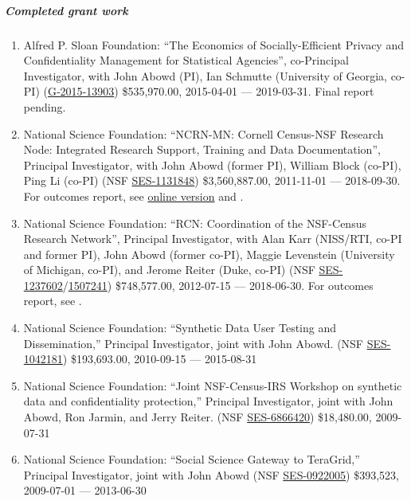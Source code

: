 \documentclass[10pt,letterpaper]{report}
\begin{document}
\subparagraph{Completed grant work}
\begin{enumerate}
\item Alfred P. Sloan Foundation: ``The Economics of Socially-Efficient Privacy and Confidentiality Management for Statistical Agencies'', co-Principal Investigator, with John Abowd (PI), Ian Schmutte (University of Georgia, co-PI) (\href{https://sloan.org/grant-detail/6845}{G‐2015‐13903}) \$535,970.00, 2015-04-01 --- 2019-03-31. Final report pending.

\item National Science Foundation: ``NCRN-MN: Cornell Census-NSF Research Node: Integrated Research Support, Training and Data Documentation'', Principal Investigator, with John Abowd (former PI), William Block (co-PI), Ping Li (co-PI) (NSF \href{http://www.nsf.gov/awardsearch/showAward.do?AwardNumber=1131848}{SES-1131848}) \$3,560,887.00, 2011-11-01 --- 2018-09-30. For outcomes report, see  \href{https://ncrncornell.github.io/reports/outcomes-report.html}{online version} and \cite{VilhuberBlock2019}.

\item National Science Foundation: ``RCN: Coordination of the NSF-Census Research Network'', 
Principal Investigator, with Alan Karr (NISS/RTI, co-PI and former PI), John Abowd (former co-PI), Maggie Levenstein (University of Michigan, co-PI), and 
Jerome Reiter (Duke, 
co-PI) (NSF \href{http://www.nsf.gov/awardsearch/showAward.do?AwardNumber=1237602}{SES-1237602}/\href{https://www.nsf.gov/awardsearch/showAward?AWD_ID=1507241}{1507241}) \$748,577.00, 2012-07-15 --- 2018-06-30. For outcomes report, see \cite{ncrn-summary}.

\item National Science Foundation: ``Synthetic Data User Testing and Dissemination,'' Principal Investigator, joint with John Abowd. (NSF \href{http://www.nsf.gov/awardsearch/showAward.do?AwardNumber=1042181}{SES-1042181}) \$193,693.00, 2010-09-15 --- 2015-08-31

\item National Science Foundation: ``Joint NSF-Census-IRS Workshop on
  synthetic data and confidentiality protection,'' Principal Investigator, joint with John Abowd,
  Ron Jarmin, and Jerry Reiter. (NSF \href{http://www.nsf.gov/awardsearch/showAward.do?AwardNumber=6866420}{SES-6866420}) \$18,480.00, 2009-07-31

\item National Science Foundation: ``Social Science Gateway to TeraGrid,''
Principal Investigator,  joint with John Abowd (NSF \href{http://www.nsf.gov/awardsearch/showAward.do?AwardNumber=0922005}{SES-0922005}) \$393,523,  2009-07-01 --- 2013-06-30


\end{enumerate}
\end{document}
